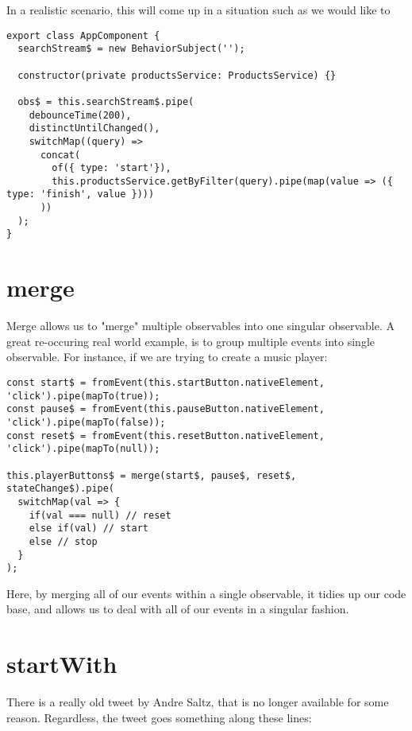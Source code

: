 In a realistic scenario, this will come up in a situation such as we would like to

\begin{lstlisting}[caption=search-bar.component.ts]
export class AppComponent {
  searchStream$ = new BehaviorSubject('');

  constructor(private productsService: ProductsService) {}

  obs$ = this.searchStream$.pipe(
    debounceTime(200),
    distinctUntilChanged(),
    switchMap((query) => 
      concat(
        of({ type: 'start'}),
        this.productsService.getByFilter(query).pipe(map(value => ({ type: 'finish', value })))
      ))
  );
}   
\end{lstlisting}

\section{merge}
Merge allows us to "merge" multiple observables into one singular observable. A
great re-occuring real world example, is to group multiple events into single 
observable. For instance, if we are trying to create a music player:
\begin{lstlisting}[caption=player-buttons.component.ts]
const start$ = fromEvent(this.startButton.nativeElement, 'click').pipe(mapTo(true));
const pause$ = fromEvent(this.pauseButton.nativeElement, 'click').pipe(mapTo(false));
const reset$ = fromEvent(this.resetButton.nativeElement, 'click').pipe(mapTo(null));

this.playerButtons$ = merge(start$, pause$, reset$, stateChange$).pipe(
  switchMap(val => {
    if(val === null) // reset 
    else if(val) // start
    else // stop
  }
);
\end{lstlisting}

Here, by merging all of our events within a single observable, it tidies up our
code base, and allows us to deal with all of our events in a singular fashion.

\section{startWith}
There is a really old tweet by Andre Saltz, that is no longer available for some 
reason. Regardless, the tweet goes something along these lines: 
\begin{quote}
\end{quote}

